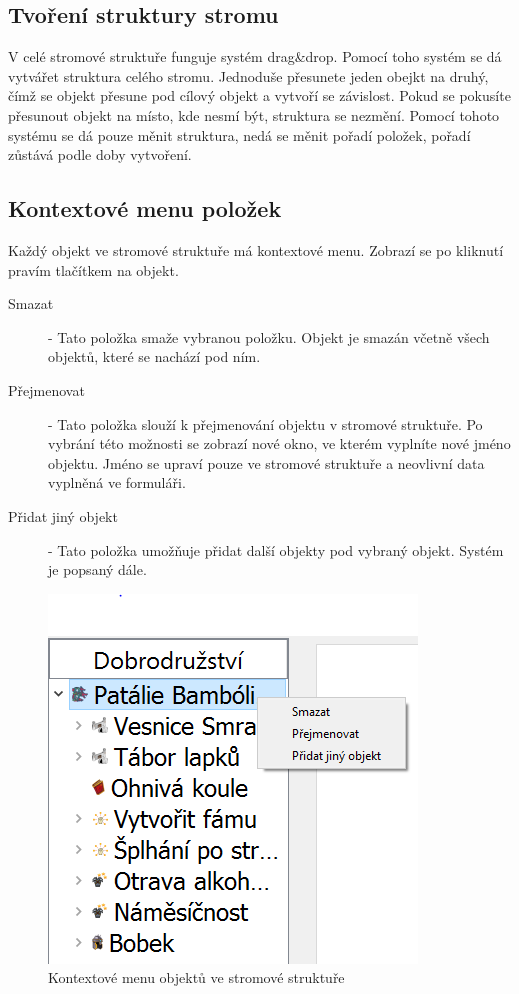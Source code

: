 \documentclass[12pt,a4paper,oneside]{article}
\begin{document}
	
\subsection{Tvoření struktury stromu}

V celé stromové struktuře funguje systém drag\&drop. Pomocí toho systém se dá vytvářet struktura celého stromu. Jednoduše přesunete jeden obejkt na druhý, čímž se objekt přesune pod cílový objekt a vytvoří se závislost. Pokud se pokusíte přesunout objekt na místo, kde nesmí být, struktura se nezmění. Pomocí tohoto systému se dá pouze měnit struktura, nedá se měnit pořadí položek, pořadí zůstává podle doby vytvoření. \par

	\newpage

\subsection{Kontextové menu položek}

	
Každý objekt ve stromové struktuře má kontextové menu. Zobrazí se po kliknutí pravím tlačítkem na objekt. 

\begin{description}
	\item[Smazat] - Tato položka smaže vybranou položku. Objekt je smazán včetně všech objektů, které se nachází pod ním. 
	
	\item[Přejmenovat] - Tato položka slouží k přejmenování objektu v stromové struktuře. Po vybrání této možnosti se zobrazí nové okno, ve kterém vyplníte nové jméno objektu. Jméno se upraví pouze ve stromové struktuře a neovlivní data vyplněná ve formuláři.
	
	\item[Přidat jiný objekt] - Tato položka umožňuje přidat další objekty pod vybraný objekt. Systém je popsaný dále.
\end{description}	

		\begin{figure}[h]
  		\centering  		
    		\includegraphics[width=0.8\linewidth]{images/editace_strom_context}
    		\caption{Kontextové menu objektů ve stromové struktuře}
    		\label{fig:editace_strom_menu}  	  		
  		\vfill
	\end{figure}	
	
\end{document}
